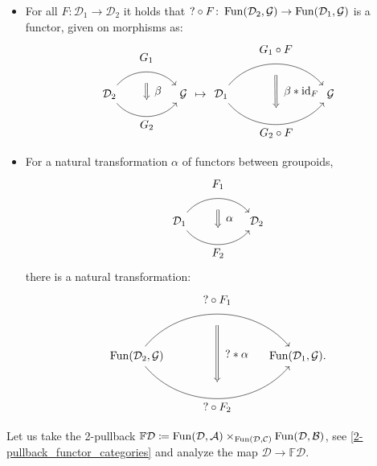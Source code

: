 \begin{construction}
\begin{Interlude}
\begin{itemize}
			\item 
			For all $  F \colon \mathcal{ D }_1 \to \mathcal{ D }_2 $ it holds that $ ? \circ F \colon \operatorname{Fun} ( \mathcal{ D }_2 , \mathcal{ G } ) \to \operatorname{Fun} ( \mathcal{ D }_1 , \mathcal{ G } ) $ is a functor, given on morphisms as: 
			\[
			\begin{tikzcd}
				\mathcal{ D }_2
				\arrow[bend left=50]{rr}[name=U',label=above:$ G_1 $]{}
				\arrow[bend right=50]{rr}[name=D',label=below:$ G_2 $]{}
				&&
				\mathcal{ G }
				\arrow[shorten <=10pt,shorten >=10pt,Rightarrow,to path={(U') -- node[label=right:$ \beta $] {} (D')}]{} 
			\end{tikzcd}
		\mapsto
			\begin{tikzcd}[column sep=1.4cm]
				\mathcal{ D }_1
				\arrow[bend left=50]{rr}[name=U',label=above:$G_1 \circ F $]{}
				\arrow[bend right=50]{rr}[name=D',label=below:$G_2 \circ F $]{}
				&&
				\mathcal{ G }
				\arrow[shorten <=10pt,shorten >=10pt,Rightarrow,to path={(U') -- node[label=right:$ \beta * \id_F $] {} (D')}]{} 
			\end{tikzcd}
			\] 
			
			\item 
			For a natural transformation $ \alpha $ of functors between groupoids,
			\[
			\begin{tikzcd}
				\mathcal{ D }_1
				\arrow[bend left=50]{rr}[name=U',label=above:$F_1$]{}
				\arrow[bend right=50]{rr}[name=D',label=below:$F_2$]{}
				&&
				\mathcal{ D }_2
				\arrow[shorten <=10pt,shorten >=10pt,Rightarrow,to path={(U') -- node[label=right:$\alpha$] {} (D')}]{} 
			\end{tikzcd}
			\]
			there is a natural transformation:
			\[
			\begin{tikzcd}[column sep=1.5cm]
				\Fun( \mathcal{ D }_2 , \mathcal{ G } )
				\arrow[bend left=50]{rr}[name=U',label=above:$? \circ F_1$]{}
				\arrow[bend right=50]{rr}[name=D',label=below:$? \circ F_2$]{}
				&&
				\Fun( \mathcal{ D }_1 , \mathcal{ G } ).
				\arrow[shorten <=10pt,shorten >=10pt,Rightarrow,to path={(U') -- node[label=right:$? * \alpha$] {} (D')}]{} 
			\end{tikzcd}
			\]
		\end{itemize} 
	\end{Interlude}
\end{construction}

Let us take the 2-pullback $ \mathbb{ F } \mathcal{D} \coloneqq \operatorname{Fun} ( \mathcal{ D } , \mathcal{ A } ) \times_{ \operatorname{Fun} ( \mathcal{ D } , \mathcal{ C } ) } \operatorname{Fun} ( \mathcal{ D } , \mathcal{ B } ) $, see \ref{2-pullback_functor_categories} and analyze the map $ \mathcal{ D } \to \mathbb{ F } \mathcal{ D } $. 

